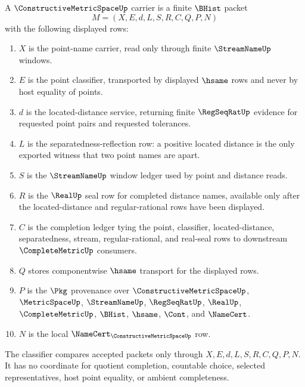 \begin{definition}
\label{def:constructive-metric-space-carrier}
A $\ConstructiveMetricSpaceUp$ carrier is a finite $\BHist$ packet
$$
M=(X,E,d,L,S,R,C,Q,P,N)
$$
with the following displayed rows:
\begin{enumerate}
\item $X$ is the point-name carrier, read only through finite $\StreamNameUp$ windows.
\item $E$ is the point classifier, transported by displayed $\hsame$ rows and never by host equality of points.
\item $d$ is the located-distance service, returning finite $\RegSeqRatUp$ evidence for requested point pairs and requested tolerances.
\item $L$ is the separatedness-reflection row: a positive located distance is the only exported witness that two point names are apart.
\item $S$ is the $\StreamNameUp$ window ledger used by point and distance reads.
\item $R$ is the $\RealUp$ seal row for completed distance names, available only after the located-distance and regular-rational rows have been displayed.
\item $C$ is the completion ledger tying the point, classifier, located-distance, separatedness, stream, regular-rational, and real-seal rows to downstream $\CompleteMetricUp$ consumers.
\item $Q$ stores componentwise $\hsame$ transport for the displayed rows.
\item $P$ is the $\Pkg$ provenance over $\ConstructiveMetricSpaceUp$, $\MetricSpaceUp$, $\StreamNameUp$, $\RegSeqRatUp$, $\RealUp$, $\CompleteMetricUp$, $\BHist$, $\hsame$, $\Cont$, and $\NameCert$.
\item $N$ is the local $\NameCert_{\ConstructiveMetricSpaceUp}$ row.
\end{enumerate}
The classifier compares accepted packets only through $X,E,d,L,S,R,C,Q,P,N$. It has no coordinate for quotient completion, countable choice, selected representatives, host point equality, or ambient completeness.
\end{definition}

